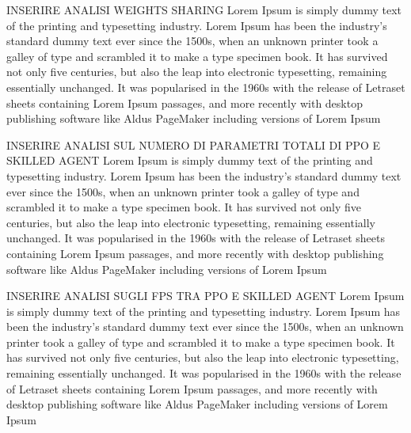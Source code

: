 

INSERIRE ANALISI WEIGHTS SHARING
Lorem Ipsum is simply dummy text of the printing and typesetting industry. Lorem Ipsum has been the industry's standard dummy text ever since the 1500s, when an unknown printer took a galley of type and scrambled it to make a type specimen book. It has survived not only five centuries, but also the leap into electronic typesetting, remaining essentially unchanged. It was popularised in the 1960s with the release of Letraset sheets containing Lorem Ipsum passages, and more recently with desktop publishing software like Aldus PageMaker including versions of Lorem Ipsum

INSERIRE ANALISI SUL NUMERO DI PARAMETRI TOTALI DI PPO E SKILLED AGENT
Lorem Ipsum is simply dummy text of the printing and typesetting industry. Lorem Ipsum has been the industry's standard dummy text ever since the 1500s, when an unknown printer took a galley of type and scrambled it to make a type specimen book. It has survived not only five centuries, but also the leap into electronic typesetting, remaining essentially unchanged. It was popularised in the 1960s with the release of Letraset sheets containing Lorem Ipsum passages, and more recently with desktop publishing software like Aldus PageMaker including versions of Lorem Ipsum

INSERIRE ANALISI SUGLI FPS TRA PPO E SKILLED AGENT
Lorem Ipsum is simply dummy text of the printing and typesetting industry. Lorem Ipsum has been the industry's standard dummy text ever since the 1500s, when an unknown printer took a galley of type and scrambled it to make a type specimen book. It has survived not only five centuries, but also the leap into electronic typesetting, remaining essentially unchanged. It was popularised in the 1960s with the release of Letraset sheets containing Lorem Ipsum passages, and more recently with desktop publishing software like Aldus PageMaker including versions of Lorem Ipsum


